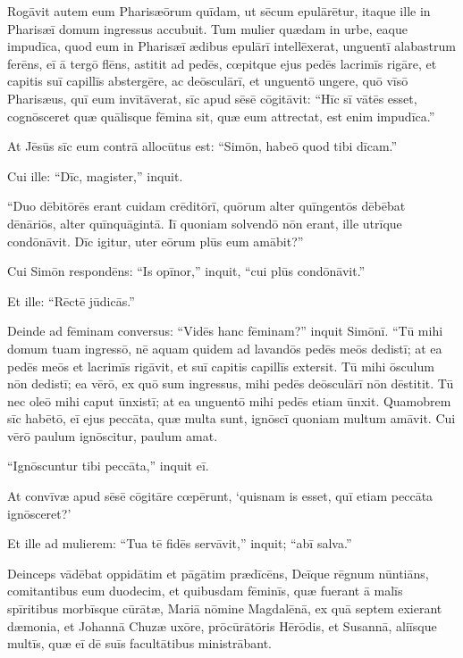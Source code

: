 \Versus Rogāvit autem eum Pharisæōrum quīdam, ut sēcum epulārētur, itaque ille in Pharisæī domum ingressus accubuit.
\Versus Tum mulier quædam in urbe, eaque impudīca, quod eum in Pharisæī ædibus epulārī intellēxerat, unguentī alabastrum ferēns,
\Versus eī ā tergō flēns, astitit ad pedēs, cœpitque ejus pedēs lacrimīs rigāre, et capitis suī capillīs abstergēre, ac deōsculārī, et unguentō ungere,
\Versus quō vīsō Pharisæus, quī eum invītāverat, sīc apud sēsē cōgitāvit: ``Hīc sī vātēs esset, cognōsceret quæ quālisque fēmina sit, quæ eum attrectat, est enim impudīca.''

\Versus At Jēsūs sīc eum contrā allocūtus est: ``Simōn, habeō quod tibi dīcam.''

Cui ille: ``Dīc, magister,'' inquit.


\Versus ``Duo dēbitōrēs erant cuidam crēditōrī, quōrum alter quīngentōs dēbēbat dēnāriōs, alter quīnquāgintā.
\Versus Iī quoniam solvendō nōn erant, ille utrīque condōnāvit. Dīc igitur, uter eōrum plūs eum amābit?''

\Versus Cui Simōn respondēns: ``Is opīnor,'' inquit, ``cui plūs condōnāvit.''

Et ille: ``Rēctē jūdicās.''

\Versus Deinde ad fēminam conversus: ``Vidēs hanc fēminam?'' inquit Simōnī. ``Tū mihi domum tuam ingressō, nē aquam quidem ad lavandōs pedēs meōs dedistī; at ea pedēs meōs et lacrimīs rigāvit, et suī capitis capillīs extersit.
\Versus Tū mihi ōsculum nōn dedistī; ea vērō, ex quō sum ingressus, mihi pedēs deōsculārī nōn dēstitit.
\Versus Tū nec oleō mihi caput ūnxistī; at ea unguentō mihi pedēs etiam ūnxit.
\Versus Quamobrem sīc habētō, eī ejus peccāta, quæ multa sunt, ignōscī quoniam multum amāvit. Cui vērō paulum ignōscitur, paulum amat.

\Versus ``Ignōscuntur tibi peccāta,'' inquit eī.

\Versus At convīvæ apud sēsē cōgitāre cœpērunt, `quisnam is esset, quī etiam peccāta ignōsceret?'

\Versus Et ille ad mulierem: ``Tua tē fidēs servāvit,'' inquit; ``abī salva.''


\Caput
\Versus Deinceps vādēbat oppidātim et pāgātim prædīcēns, Deīque rēgnum nūntiāns, comitantibus eum duodecim,
\Versus et quibusdam fēminīs, quæ fuerant ā malīs spīritibus morbīsque cūrātæ, Mariā nōmine Magdalēnā, ex quā septem exierant dæmonia,
\Versus et Johannā Chuzæ uxōre, prōcūrātōris Hērōdis, et Susannā, aliīsque multīs, quæ eī dē suīs facultātibus ministrābant.

